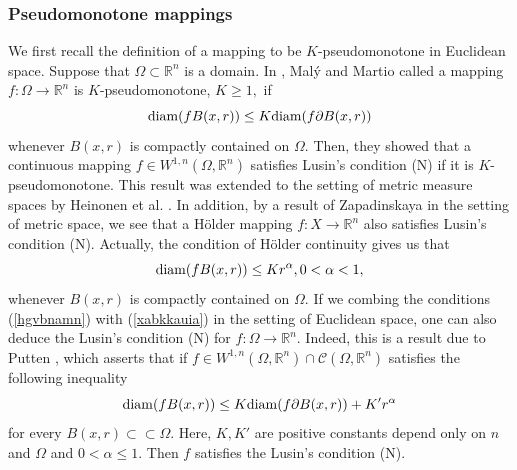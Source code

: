 \documentclass[11pt,twoside]{article}
\theoremstyle{definition}
\theoremstyle{remark}
\begin{document}
\subsubsection{Pseudomonotone mappings}\label{ajdbaxb}
We first recall the definition of  a mapping to be $K$-pseudomonotone in Euclidean space. Suppose that $ \Omega\subset\mathbb{R}^{n}$ is a domain. In \cite{MM95},  Mal\'{y} and Martio \cite{MM95} called a mapping $f:\Omega\rightarrow \mathbb{R}^{n}$ 
is $K$-pseudomonotone, $K\geq1,$ if
\begin{equation}\label{hgvbnamn}
{\rm diam}(fB(x,r))\leq K{\rm diam}(f\partial B(x,r))
\end{equation}
whenever $B(x,r)$ is compactly contained on $\Omega.$ Then, they showed that a continuous mapping $f\in W^{1,n}(\Omega,\mathbb{R}^{n})$ satisfies Lusin's condition (N) if it is $K$-pseudomonotone.
This result was extended to the setting of metric measure spaces by Heinonen et al. \cite[Theorem 7.2]{HKST01}. In addition,  by a result of Zapadinskaya \cite[Theorem 1]{Zap14} in the setting of metric space, we see that a H\"{o}lder mapping $f:X\rightarrow \mathbb{R}^{n}$ also satisfies Lusin's condition (N). Actually, the condition of H\"{o}lder continuity gives us that 
\begin{equation}\label{xabkkauia}
{\rm diam}(fB(x,r))\leq Kr^{\alpha},0<\alpha<1,
\end{equation}
 whenever $B(x,r)$ is compactly contained on $\Omega.$ If we combing the conditions (\ref{hgvbnamn}) with (\ref{xabkkauia}) in the setting of Euclidean space,   one can also deduce the Lusin's condition (N)
 for $f:\Omega\rightarrow \mathbb{R}^{n}.$ Indeed, this is a result due to Putten \cite[Theorem 3.1]{Put03}, which asserts that if $f\in W^{1,n}(\Omega,\mathbb{R}^{n})\cap \mathcal{C}(\Omega,\mathbb{R}^{n})$  satisfies the following inequality 
 \begin{equation}\label{hahdjad}
 {\rm diam}(fB(x,r))\leq K{\rm diam}(f\partial B(x,r))+K'r^{\alpha}
 \end{equation} 
for every $B(x,r)\subset\subset\Omega.$ Here, $K,K'$ are positive constants depend only on $n$ and $\Omega$ and $0<\alpha\leq1.$ Then $f$ satisfies the Lusin's condition (N).
\end{document}
